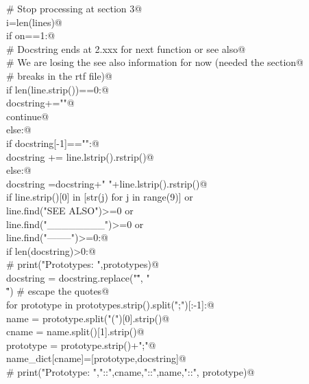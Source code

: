 \documentclass[10pt,a4paper,twoside,notitlepage]{article}
\begin{document}
\begin{flushleft}
\begin{minipage}{\linewidth}
\begin{list}{}{}
\mbox{}\verb@      # Stop processing at section 3@\\
\mbox{}\verb@      i=len(lines)@\\
\mbox{}\verb@   if on==1:@\\
\mbox{}\verb@      # Docstring ends at 2.xxx for next function or see also@\\
\mbox{}\verb@      # We are losing the see also information for now (needed the section@\\
\mbox{}\verb@      # breaks in the rtf file)@\\
\mbox{}\verb@      if len(line.strip())==0:@\\
\mbox{}\verb@         docstring+="\n"@\\
\mbox{}\verb@         continue@\\
\mbox{}\verb@      else:@\\
\mbox{}\verb@         if docstring[-1]=="\n":@\\
\mbox{}\verb@            docstring += line.lstrip().rstrip()@\\
\mbox{}\verb@         else:@\\
\mbox{}\verb@            docstring =docstring+" "+line.lstrip().rstrip()@\\
\mbox{}\verb@      if line.strip()[0] in [str(j) for j in range(9)] or \@\\
\mbox{}\verb@            line.find("SEE ALSO")>=0 or \@\\
\mbox{}\verb@            line.find("________")>=0 or \@\\
\mbox{}\verb@            line.find("--------")>=0:@\\
\mbox{}\verb@         if len(docstring)>0:@\\
\mbox{}\verb@            # print("Prototypes: ",prototypes)@\\
\mbox{}\verb@            docstring = docstring.replace("\"", " \\\"") # escape the quotes@\\
\mbox{}\verb@            for prototype in prototypes.strip().split(";")[:-1]:@\\
\mbox{}\verb@                name = prototype.split("(")[0].strip()@\\
\mbox{}\verb@                cname = name.split()[1].strip()@\\
\mbox{}\verb@                prototype = prototype.strip()+";"@\\
\mbox{}\verb@                name_dict[cname]=[prototype,docstring]@\\
\mbox{}\verb@                # print("Prototype: ","::",cname,"::",name,"::", prototype)@\\

\end{list}
\end{minipage}
\end{flushleft}
\end{document}
